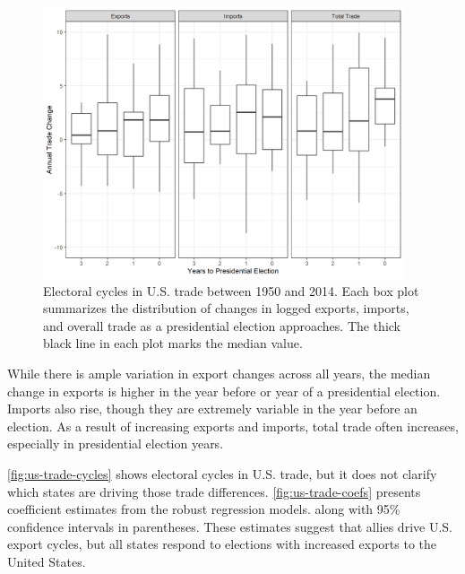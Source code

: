 \documentclass[12pt]{article}
\begin{document}
\begin{figure}
\centering
\includegraphics[width=0.95\textwidth]{../figures/us-trade-cycles.png}
\caption{Electoral cycles in U.S. trade between 1950 and 2014. Each box plot summarizes the distribution of changes in logged exports, imports, and overall trade as a presidential election approaches. The thick black line in each plot marks the median value.}
\label{fig:us-trade-cycles}
\end{figure}


While there is ample variation in export changes across all years, the median change in exports is higher in the year before or year of a presidential election.
Imports also rise, though they are extremely variable in the year before an election. 
As a result of increasing exports and imports, total trade often increases, especially in presidential election years.


\autoref{fig:us-trade-cycles} shows electoral cycles in U.S. trade, but it does not clarify which states are driving those trade differences. 
\autoref{fig:us-trade-coefs} presents coefficient estimates from the robust regression models. along with 95\% confidence intervals in parentheses. 
These estimates suggest that allies drive U.S. export cycles, but all states respond to elections with increased exports to the United States. 
\end{document}
